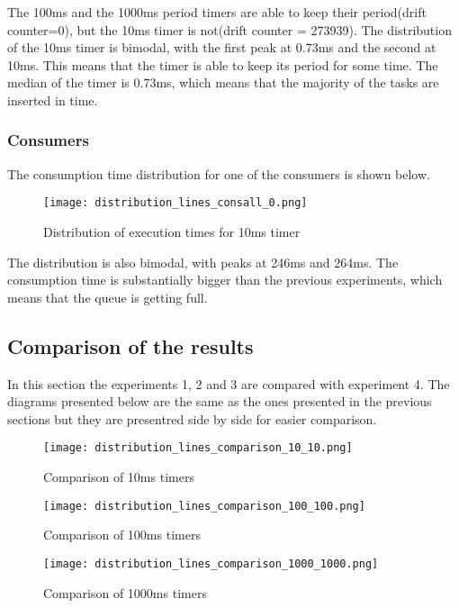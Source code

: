 \documentclass[12pt, a4paper]{report}
\begin{document}
The 100ms and the 1000ms period timers are able to keep their period(drift counter=0), but the 10ms timer
is not(drift counter = 273939). The distribution of the 10ms timer is bimodal, with the first peak at 0.73ms and
the second at 10ms. This means that the timer is able to keep its period for some time. The median of the timer is 0.73ms, which means that the majority of the tasks are inserted
in time.


\subsubsection*{Consumers}

The consumption time distribution for one of the consumers is shown below.

\begin{figure}[H]
    \centering
    \texttt{[image: distribution\_lines\_consall\_0.png]}
    \caption{Distribution of execution times for 10ms timer}
\end{figure}


The distribution is also bimodal, with peaks at 246ms and 264ms. 
The consumption time is substantially bigger than the previous experiments,
which means that the queue is getting full.

\subsection*{Comparison of the results}

In this section the experiments 1, 2 and 3 are compared
with experiment 4. The diagrams presented below are the 
same as the ones presented in the previous sections but
they are presentred side by side for easier comparison.

\begin{figure}[H]
    \centering
    \texttt{[image: distribution\_lines\_comparison\_10\_10.png]}
    \caption{Comparison of 10ms timers}
\end{figure}

\begin{figure}[H]
    \centering
    \texttt{[image: distribution\_lines\_comparison\_100\_100.png]}
    \caption{Comparison of 100ms timers}
\end{figure}

\begin{figure}[H]
    \centering
    \texttt{[image: distribution\_lines\_comparison\_1000\_1000.png]}
    \caption{Comparison of 1000ms timers}
\end{figure}
\end{document}
